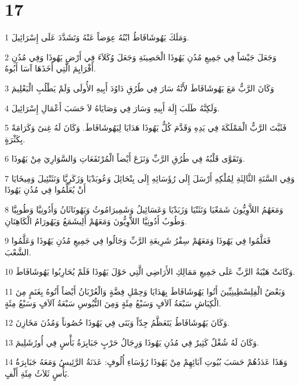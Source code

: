 \chapter{17}

\par 1 وَمَلَكَ يَهُوشَافَاطُ ابْنُهُ عِوَضاً عَنْهُ وَتَشَدَّدَ عَلَى إِسْرَائِيلَ.
\par 2 وَجَعَلَ جَيْشاً فِي جَمِيعِ مُدُنِ يَهُوذَا الْحَصِينَةِ وَجَعَلَ وُكَلاَءَ فِي أَرْضِ يَهُوذَا وَفِي مُدُنِ أَفْرَايِمَ الَّتِي أَخَذَهَا آسَا أَبُوهُ.
\par 3 وَكَانَ الرَّبُّ مَعَ يَهُوشَافَاطَ لأَنَّهُ سَارَ فِي طُرُقِ دَاوُدَ أَبِيهِ الأُولَى وَلَمْ يَطْلُبِ الْبَعْلِيمَ
\par 4 وَلَكِنَّهُ طَلَبَ إِلَهَ أَبِيهِ وَسَارَ فِي وَصَايَاهُ لاَ حَسَبَ أَعْمَالِ إِسْرَائِيلَ.
\par 5 فَثَبَّتَ الرَّبُّ الْمَمْلَكَةَ فِي يَدِهِ وَقَدَّمَ كُلُّ يَهُوذَا هَدَايَا لِيَهُوشَافَاطَ. وَكَانَ لَهُ غِنىً وَكَرَامَةً بِكَثْرَةٍ.
\par 6 وَتَقَوَّى قَلْبُهُ فِي طُرُقِ الرَّبِّ وَنَزَعَ أَيْضاً الْمُرْتَفَعَاتِ وَالسَّوَارِيَ مِنْ يَهُوذَا.
\par 7 وَفِي السَّنَةِ الثَّالِثَةِ لِمُلْكِهِ أَرْسَلَ إِلَى رُؤَسَائِهِ إِلَى بِنْحَائِلَ وَعُوبَدْيَا وَزَكَرِيَّا وَنَثَنْئِيلَ وَمِيخَايَا أَنْ يُعَلِّمُوا فِي مُدُنِ يَهُوذَا
\par 8 وَمَعَهُمُ اللاَّوِيُّونَ شَمَعْيَا وَنَثَنْيَا وَزَبَدْيَا وَعَسَائِيلُ وَشَمِيرَامُوثُ وَيَهُونَاثَانُ وَأَدُونِيَّا وَطُوبِيَّا وَطُوبُ أَدُونِيَّا اللاَّوِيُّونَ وَمَعَهُمْ أَلِيشَمَعُ وَيَهُورَامُ الْكَاهِنَانِ.
\par 9 فَعَلَّمُوا فِي يَهُوذَا وَمَعَهُمْ سِفْرُ شَرِيعَةِ الرَّبِّ وَجَالُوا فِي جَمِيعِ مُدُنِ يَهُوذَا وَعَلَّمُوا الشَّعْبَ.
\par 10 وَكَانَتْ هَيْبَةُ الرَّبِّ عَلَى جَمِيعِ مَمَالِكِ الأَرَاضِي الَّتِي حَوْلَ يَهُوذَا فَلَمْ يُحَارِبُوا يَهُوشَافَاطَ.
\par 11 وَبَعْضُ الْفِلِسْطِينِيِّينَ أَتُوا يَهُوشَافَاطَ بِهَدَايَا وَحِمْلِ فِضَّةٍ وَالْعُرْبَانُ أَيْضاً أَتُوهُ بِغَنَمٍ مِنَ الْكِبَاشِ سَبْعَةُ آلاَفٍ وَسَبْعُ مِئَةٍ وَمِنَ التُّيُوسِ سَبْعَةُ آلاَفٍ وَسَبْعُ مِئَةٍ.
\par 12 وَكَانَ يَهُوشَافَاطُ يَتَعَظَّمُ جِدّاً وَبَنَى فِي يَهُوذَا حُصُوناً وَمُدُنَ مَخَازِنَ.
\par 13 وَكَانَ لَهُ شُغْلٌ كَثِيرٌ فِي مُدُنِ يَهُوذَا وَرِجَالُ حَرْبٍ جَبَابِرَةُ بَأْسٍ فِي أُورُشَلِيمَ.
\par 14 وَهَذَا عَدَدُهُمْ حَسَبَ بُيُوتِ آبَائِهِمْ مِنْ يَهُوذَا رُؤَسَاءِ أُلُوفٍ: عَدَنَةُ الرَّئِيسُ وَمَعَهُ جَبَابِرَةُ بَأْسٍ ثَلاَثُ مِئَةِ أَلْفٍ.
